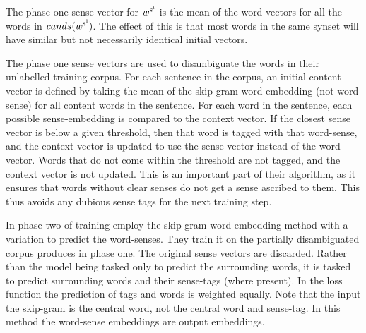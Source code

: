 \documentclass[12pt,parskip]{komatufte}
\begin{document}


The phase one sense vector for $\d w_{\n s_i}$ is the mean of the word vectors for all the words in $cands(\d w_{\n s_{i}})$.
The effect of this is that most words in the same synset will have similar but not necessarily identical initial vectors.

The phase one sense vectors are used to disambiguate the words in their unlabelled training corpus.
For each sentence in the corpus, an initial content vector is defined by taking the mean of the skip-gram word embedding (not word sense) for all content words in the sentence.
For each word in the sentence, each possible sense-embedding is compared to the context vector.
If the closest sense vector is below a given threshold,
then that word is tagged with that word-sense, and the context vector is updated to use the sense-vector instead of the word vector.
Words that do not come within the threshold are not tagged, and the context vector is not updated.
This is an important part of their algorithm, as it ensures that words without clear senses do not get a sense ascribed to them.
This thus avoids any dubious sense tags for the next training step.

In phase two of training
\textcite{Chen2014} employ the skip-gram word-embedding method with a variation to predict the word-senses.
They train it on the partially disambiguated corpus produces in phase one.
The original sense vectors are discarded.
Rather than the model being tasked only to predict the surrounding words, it is tasked to predict surrounding words and their sense-tags (where present).
In the loss function the prediction of tags and words is weighted equally.
Note that the input the skip-gram is the central word, not the central word and sense-tag.
In this method the word-sense embeddings are output embeddings.
\end{document}
